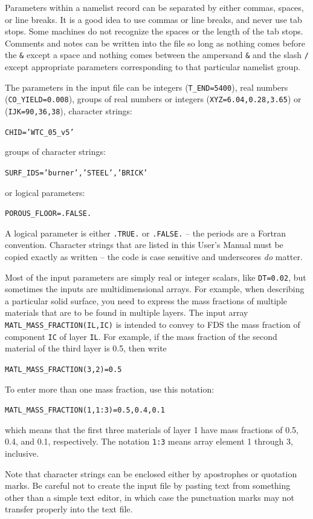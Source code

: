 \documentclass[11pt]{book}
\newcommand{\ct}{\tt\small}
\begin{document}
Parameters within a namelist record can be separated by either commas, spaces, or line breaks. It is a good idea to use
commas or line breaks, and never use tab stops. Some machines do not recognize the spaces or the length of the tab stops.
Comments and notes can be written into the file so long as nothing comes
before the {\ct \&} except a space and nothing comes between the ampersand
{\ct \&} and the slash {\ct /} except appropriate parameters corresponding
to that particular namelist group.

The parameters in the input file can be integers ({\ct T\_END=5400}),
real numbers ({\ct CO\_YIELD=0.008}), groups of real numbers or integers
({\ct XYZ=6.04,0.28,3.65}) or ({\ct IJK=90,36,38}),
character strings:

{\ct CHID='WTC\_05\_v5'}

\noindent
groups of character strings:

{\ct SURF\_IDS='burner','STEEL','BRICK'}

\noindent
or logical parameters:

{\ct POROUS\_FLOOR=.FALSE.}

\noindent
A logical parameter is either
{\ct .TRUE.} or {\ct .FALSE.} -- the periods are a
Fortran convention. Character strings that are listed in
this User's Manual must be copied exactly as written -- the code
is case sensitive and underscores {\em do} matter.

Most of the input parameters are simply real or integer scalars, like {\ct DT=0.02}, but sometimes the inputs are
multidimensional arrays. For example, when describing a particular solid surface, you need to express the mass
fractions of multiple materials that are to be found in multiple layers. The input array {\ct MATL\_MASS\_FRACTION(IL,IC)} is
intended to convey to FDS the mass fraction of component {\ct IC} of layer {\ct IL}. For example, if the mass fraction of the
second material of the third layer is 0.5, then write

{\ct MATL\_MASS\_FRACTION(3,2)=0.5}

\noindent
To enter more than one mass fraction, use
this notation:

{\ct MATL\_MASS\_FRACTION(1,1:3)=0.5,0.4,0.1}

\noindent
which means that the first three materials of layer 1 have
mass fractions of 0.5, 0.4, and 0.1, respectively. The notation {\ct 1:3} means array element 1 through 3, inclusive.



\begin{warning}
\noindent
Note that character strings can be enclosed either by apostrophes or quotation marks.
Be careful not to create the input file by pasting text from something other than a
simple text editor, in which case the punctuation marks may not transfer
properly into the text file.
\end{warning}
\end{document}
